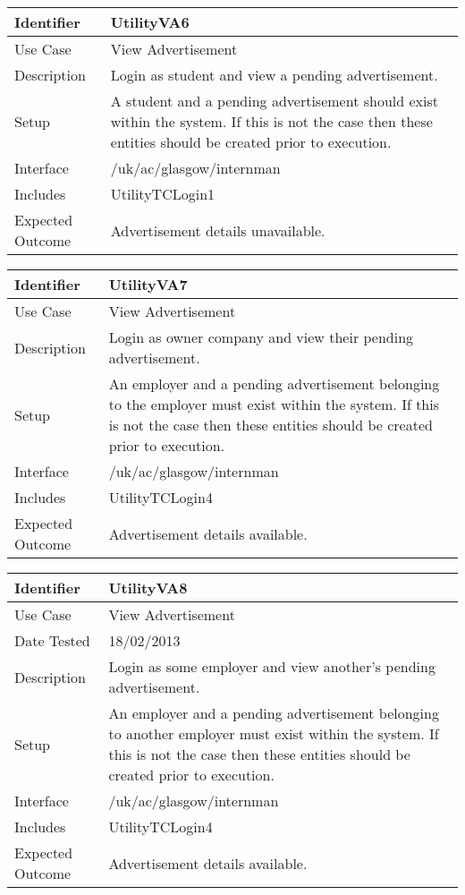 \vspace{2em}

\begin{tabularx}{\textwidth}{|T|L|}
\hline
Identifier & UtilityVA6\\
\hline
Use Case & View Advertisement \\
\hline
Description & Login as student and view a pending advertisement.\\
\hline
Setup & A student and a pending advertisement should exist within the
system. If this is not the case then these entities should be created
prior to execution. \\
\hline
Interface & /uk/ac/glasgow/internman \\
\hline
Includes & UtilityTCLogin1 \\
\hline
Expected Outcome & Advertisement details unavailable.\\
\hline
\end{tabularx}

\vspace{2em}

\begin{tabularx}{\textwidth}{|T|L|}
\hline
Identifier & UtilityVA7\\
\hline
Use Case & View Advertisement \\
\hline
Description & Login as owner company and view their pending advertisement.\\
\hline
Setup & An employer and a pending advertisement belonging to the
employer must exist within the system. If this is not the case then
these entities should be created prior to execution.\\
\hline
Interface & /uk/ac/glasgow/internman \\
\hline
Includes & UtilityTCLogin4\\
\hline
Expected Outcome & Advertisement details available.\\
\hline
\end{tabularx}

\vspace{2em}

\begin{tabularx}{\textwidth}{|T|L|}
\hline
Identifier & UtilityVA8\\
\hline
Use Case & View Advertisement \\
\hline
Date Tested & 18/02/2013\\
\hline
Description & Login as some employer and view another's pending advertisement.\\
\hline
Setup & An employer and a pending advertisement belonging to another
employer must exist within the system. If this is not the case then
these entities should be created prior to execution. \\
\hline
Interface & /uk/ac/glasgow/internman \\
\hline
Includes & UtilityTCLogin4\\
\hline
Expected Outcome & Advertisement details available.\\
\hline
\end{tabularx}


